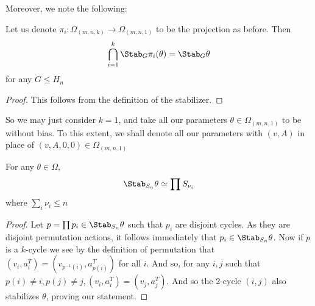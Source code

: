 \documentclass[11pt,letterpaper]{amsart}
\begin{document}
Moreover, we note the following:
\begin{lemma}\label{lem:intersectionstab}
    Let us denote $\pi_i: \Omega_{(m,n,k)}\rightarrow \Omega_{(m,n,1)}$ to be the projection as before. Then 
    $$
    \bigcap_{i=1}^{k} \Stab_{G}\pi_i(\theta) = \Stab_{G}\theta
    $$
    for any $G\leq H_n$
\end{lemma}
\begin{proof}
    This follows from the definition of the stabilizer.
\end{proof}
So we may just consider $k=1$, and take all our parameters $\theta\in \Omega_{(m,n,1)}$ to be without bias. To this extent, we shall denote all our parameters with $(v, A)$ in place of $(v, A,0,0)\in \Omega_{(m,n,1)}$ 
\begin{lemma}
    For any $\theta\in \Omega$, 
    $$
    \Stab_{S_n}\theta \simeq \prod S_{\nu_i}
    $$
    where $\sum_i \nu_i \leq n$
\end{lemma}
\begin{proof}
    Let $p=\prod p_i\in \Stab_{S_n}\theta$ such that $p_i$ are disjoint cycles. As they are disjoint permutation actions, it follows immediately that $p_i\in\Stab_{S_n}\theta$. Now if $p$ is a $k$-cycle we see by the definition of permutation that $(v_i, a^T_i) = (v_{p^{-1}(i)}, a^T_{p(i)})$ for all $i$. And so, for any $i, j$ such that $p(i)\neq i, p(j)\neq j, (v_i, a_i^T) = (v_j, a_j^T)$. And so the 2-cycle $(i ,j)$ also stabilizes $\theta$, proving our statement. 
\end{proof}
\end{document}
